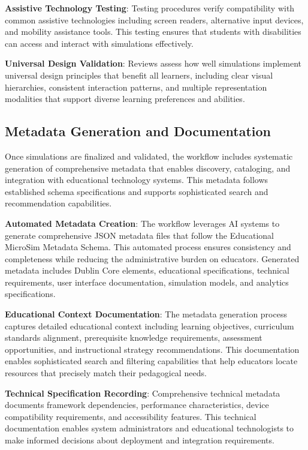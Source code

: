 \textbf{Assistive Technology Testing}: Testing procedures verify compatibility with common assistive technologies including screen readers, alternative input devices, and mobility assistance tools. This testing ensures that students with disabilities can access and interact with simulations effectively.

\textbf{Universal Design Validation}: Reviews assess how well simulations implement universal design principles that benefit all learners, including clear visual hierarchies, consistent interaction patterns, and multiple representation modalities that support diverse learning preferences and abilities.

\subsection{Metadata Generation and Documentation}

Once simulations are finalized and validated, the workflow includes systematic generation of comprehensive metadata that enables discovery, cataloging, and integration with educational technology systems. This metadata follows established schema specifications and supports sophisticated search and recommendation capabilities.

\textbf{Automated Metadata Creation}: The workflow leverages AI systems to generate comprehensive JSON metadata files that follow the Educational MicroSim Metadata Schema. This automated process ensures consistency and completeness while reducing the administrative burden on educators. Generated metadata includes Dublin Core elements, educational specifications, technical requirements, user interface documentation, simulation models, and analytics specifications.

\textbf{Educational Context Documentation}: The metadata generation process captures detailed educational context including learning objectives, curriculum standards alignment, prerequisite knowledge requirements, assessment opportunities, and instructional strategy recommendations. This documentation enables sophisticated search and filtering capabilities that help educators locate resources that precisely match their pedagogical needs.

\textbf{Technical Specification Recording}: Comprehensive technical metadata documents framework dependencies, performance characteristics, device compatibility requirements, and accessibility features. This technical documentation enables system administrators and educational technologists to make informed decisions about deployment and integration requirements.

